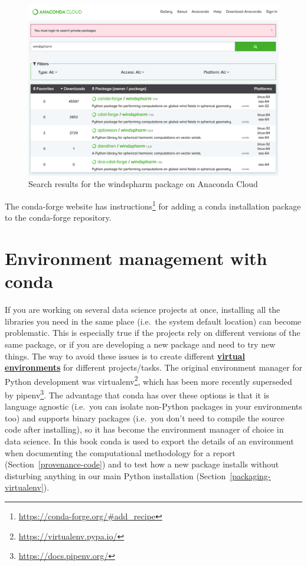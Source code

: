 \documentclass[
]{krantz}
\renewcommand{\href}[2]{#2\footnote{\url{#1}}}
\newcommand{\gref}[2]{\hyperlink{#2}{\textbf{#1}}}
\begin{document}
\begin{figure}

{\centering \includegraphics[width=1\linewidth]{figures/anaconda/cloud-windspharm-search} 

}

\caption{Search results for the windspharm package on Anaconda Cloud}\label{fig:anaconda-windspharm-search}
\end{figure}

The conda-forge website has \href{https://conda-forge.org/\#add_recipe}{instructions}
for adding a conda installation package to the conda-forge repository.

\hypertarget{anaconda-environments}{%
\section{Environment management with conda}\label{anaconda-environments}}

If you are working on several data science projects at once,
installing all the libraries you need in the same place
(i.e.~the system default location) can become problematic.
This is especially true if the projects rely on different versions of the same package,
or if you are developing a new package and need to try new things.
The way to avoid these issues is to create different
\gref{virtual environments}{virtual\_environment} for different projects/tasks.
The original environment manager for Python development was \href{https://virtualenv.pypa.io/}{virtualenv},
which has been more recently superseded by \href{https://docs.pipenv.org/}{pipenv}.
The advantage that conda has over these options is that it is language agnostic
(i.e.~you can isolate non-Python packages in your environments too) and
supports binary packages (i.e.~you don't need to compile the source code after installing),
so it has become the environment manager of choice in data science.
In this book conda is used to export the details of an environment
when documenting the computational methodology for a report (Section~\ref{provenance-code})
and to test how a new package installs without disturbing anything
in our main Python installation (Section~\ref{packaging-virtualenv}).
\end{document}
